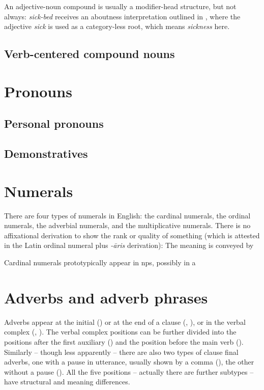 \documentclass[UTF8, a4paper, oneside, scheme=plain]{ctexrep}
\newcommand{\corpus}[1]{\emph{#1}}
\begin{document}
An adjective-noun compound is usually a modifier-head structure, 
but not always: 
\corpus{sick-bed} receives an aboutness interpretation outlined in ,
where the adjective \corpus{sick} is used as a category-less root,
which means \corpus{sickness} here.

\subsection{Verb-centered compound nouns}\label{sec:pos.noun.compound.verb-centered}

\section{Pronouns}

\subsection{Personal pronouns}

\subsection{Demonstratives}

\section{Numerals}

There are four types of numerals in English:
the cardinal numerals, 
the ordinal numerals,
the adverbial numerals,
and the multiplicative numerals.
There is no affixational derivation to show the rank or quality of something 
(which is attested in the Latin ordinal numeral plus \corpus{-āris} derivation):
The meaning is conveyed by 

Cardinal numerals prototypically appear in \acs{np}s,
possibly in a 

\section{Adverbs and adverb phrases}\label{sec:pos.adverb}

Adverbs appear at the initial () or
at the end of a clause (, ), 
or in the verbal complex (, ).
The verbal complex positions can be further divided into 
the positions after the first auxiliary ()
and the position before the main verb ().
Similarly -- though less apparently -- 
there are also two types of clause final adverbs,
one with a pause in utterance, usually shown by a comma (),
the other without a pause ().
All the five positions -- actually there are further subtypes -- have structural and meaning differences.
\end{document}
